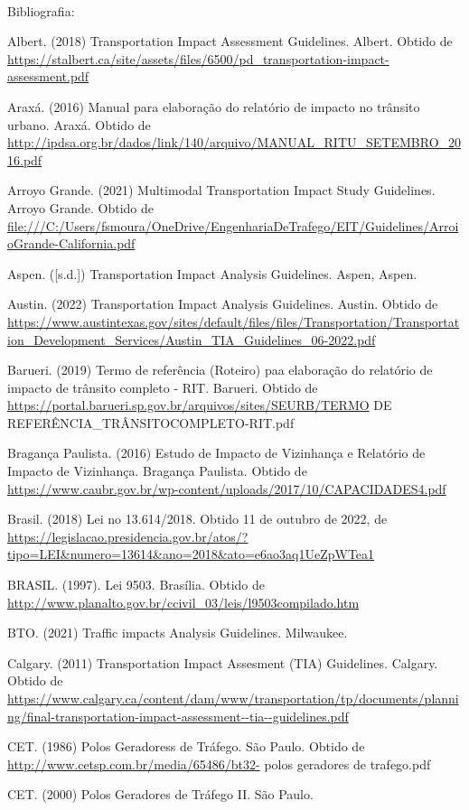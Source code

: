 \documentclass[]{article}
\begin{document}
~

{ Bibliografia:}

Albert. (2018) Transportation Impact Assessment Guidelines. Albert.
Obtido de
\url{https://stalbert.ca/site/assets/files/6500/pd_transportation-impact-assessment.pdf}

Araxá. (2016) Manual para elaboração do relatório de impacto no trânsito
urbano. Araxá. Obtido de
\url{http://ipdsa.org.br/dados/link/140/arquivo/MANUAL_RITU_SETEMBRO_2016.pdf}

Arroyo Grande. (2021) Multimodal Transportation Impact Study Guidelines.
Arroyo Grande. Obtido de
\url{file:///C:/Users/fsmoura/OneDrive/EngenhariaDeTrafego/EIT/Guidelines/ArroioGrande-California.pdf}

Aspen. ({[}s.d.{]}) Transportation Impact Analysis Guidelines. Aspen,
Aspen.

Austin. (2022) Transportation Impact Analysis Guidelines. Austin. Obtido
de
\url{https://www.austintexas.gov/sites/default/files/files/Transportation/Transportation_Development_Services/Austin_TIA_Guidelines_06-2022.pdf}

Barueri. (2019) Termo de referência (Roteiro) paa elaboração do
relatório de impacto de trânsito completo - RIT. Barueri. Obtido de
\url{https://portal.barueri.sp.gov.br/arquivos/sites/SEURB/TERMO} DE
REFERÊNCIA\_TRÂNSITOCOMPLETO-RIT.pdf

Bragança Paulista. (2016) Estudo de Impacto de Vizinhança e Relatório de
Impacto de Vizinhança. Bragança Paulista. Obtido de
\url{https://www.caubr.gov.br/wp-content/uploads/2017/10/CAPACIDADES4.pdf}

Brasil. (2018) Lei no 13.614/2018. Obtido 11 de outubro de 2022, de
\url{https://legislacao.presidencia.gov.br/atos/?tipo=LEI\&numero=13614\&ano=2018\&ato=e6ao3aq1UeZpWTea1}

BRASIL. (1997). Lei 9503. Brasília. Obtido de
\url{http://www.planalto.gov.br/ccivil_03/leis/l9503compilado.htm}

BTO. (2021) Traffic impacts Analysis Guidelines. Milwaukee.

Calgary. (2011) Transportation Impact Assesment (TIA) Guidelines.
Calgary. Obtido de
\url{https://www.calgary.ca/content/dam/www/transportation/tp/documents/planning/final-transportation-impact-assessment--tia--guidelines.pdf}

CET. (1986) Polos Geradoress de Tráfego. São Paulo. Obtido de
\url{http://www.cetsp.com.br/media/65486/bt32-} polos geradores de
trafego.pdf

CET. (2000) Polos Geradores de Tráfego II. São Paulo.
\end{document}
